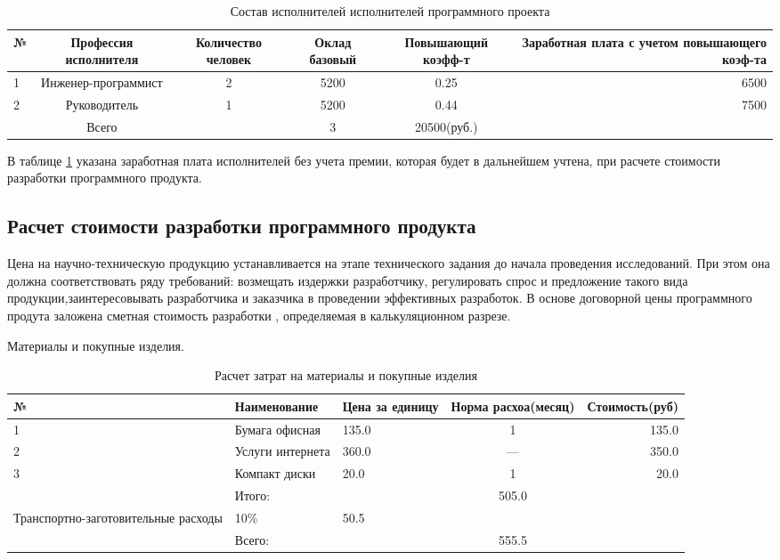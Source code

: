 \begin{par}
\begin{table}
\caption{Состав исполнителей исполнителей программного проекта}
\begin{tabular}{|l|c|c|c|c|r|}
\hline{}
№ & Профессия исполнителя & Количество человек & Оклад базовый & Повышающий  коэфф-т & Заработная плата с учетом повышающего коэф-та \\
\hline{}
1 & Инженер-программист & 2 & 5200 & 0.25 & 6500 \\
\hline{}
2 & Руководитель & 1 & 5200 & 0.44 & 7500 \\
\hline{}
& Всего &  & 3 & 20500(руб.) \\
\hline
\end{tabular}
\label{table:econSostavIspol}
\end{table}
\end{par}

\begin{par}
В таблице \ref{table:econSostavIspol} указана заработная плата исполнителей без учета премии, которая будет в
дальнейшем учтена, при расчете стоимости разработки программного продукта.
\end{par}

\subsection{Расчет  стоимости  разработки программного продукта}
\begin{par}
Цена на научно-техническую продукцию устанавливается на этапе технического задания
до начала проведения исследований.
При  этом она должна соответствовать ряду требований: возмещать  издержки разработчику,
регулировать спрос и предложение такого вида продукции,заинтересовывать
разработчика и заказчика в проведении эффективных разработок. В основе
договорной цены программного продута заложена  сметная  стоимость 
разработки , определяемая в калькуляционном разрезе.
\end{par}

Материалы и покупные изделия.

\begin{par}
\begin{table}
\caption{Расчет затрат на материалы и покупные изделия}
\begin{tabular}{|l|p{7cm}|p{4cm}|c|r|}
\hline{}
№ & Наименование & Цена за единицу& Норма расхоа(месяц) & Стоимость(руб) \\
\hline{}
1 & Бумага офисная & 135.0 & 1 & 135.0 \\
\hline{}
2 & Услуги интернета & 360.0 & --- & 350.0 \\
\hline{}
3 & Компакт диски & 20.0 & 1 & 20.0 \\
\hline{}
& Итого: & &  505.0 \\
Транспортно-заготовительные расходы & 10\% & 50.5 \\
\hline{}
& Всего: & &  555.5 \\
\hline
\end{tabular}
\label{table:reschZatrMat}
\end{table}
\end{par}

